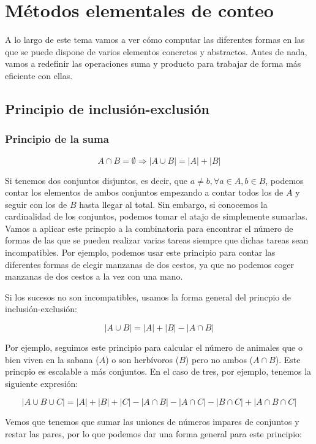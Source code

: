 \section{Métodos elementales de conteo}\label{metodos-elementales-de-conteo}

A lo largo de este tema vamos a ver cómo computar las diferentes formas en las que se puede dispone de varios elementos concretos y abstractos.
Antes de nada, vamos a redefinir las operaciones suma y producto para trabajar de forma más eficiente con ellas.

\subsection{Principio de inclusión-exclusión}\label{principio-de-inclusion-exclusion}

\subsubsection{Principio de la suma}

\[A \cap B = \emptyset \Rightarrow |A \cup B| = |A| + |B|\]

Si tenemos dos conjuntos disjuntos, es decir, que $a \neq b, \forall a \in A, b \in B$, podemos contar los elementos de ambos conjuntos empezando a contar todos los de $A$ y seguir con los de $B$ hasta llegar al total.
Sin embargo, si conocemos la cardinalidad de los conjuntos, podemos tomar el atajo de simplemente sumarlas.
Vamos a aplicar este princpio a la combinatoria para encontrar el número de formas de las que se pueden realizar varias tareas siempre que dichas tareas sean incompatibles.
Por ejemplo, podemos usar este principio para contar las diferentes formas de elegir manzanas de dos cestos, ya que no podemos coger manzanas de dos cestos a la vez con una mano.

Si los sucesos no son incompatibles, usamos la forma general del princpio de inclusión-exclusión:

\[|A \cup B| = |A| + |B| - |A \cap B|\]

Por ejemplo, seguimos este principio para calcular el número de animales que o bien viven en la sabana ($A$) o son herbívoros ($B$) pero no ambos ($A \cap B$).
Este princpio es escalable a más conjuntos.
En el caso de tres, por ejemplo, tenemos la siguiente expresión:

\[|A \cup B \cup C| = |A| + |B| + |C| - |A \cap B| - |A \cap C| - |B \cap C| + |A \cap B \cap C|\]

Vemos que tenemos que sumar las uniones de números impares de conjuntos y restar las pares, por lo que podemos dar una forma general para este principio:

